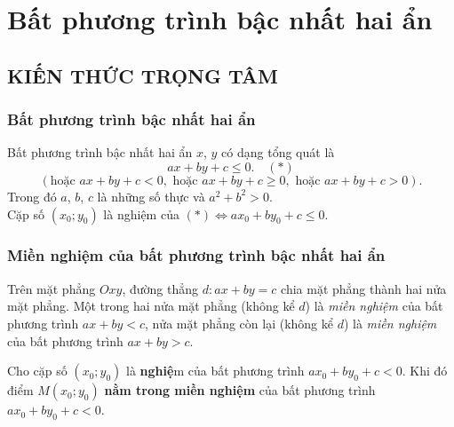 \def\tenchude{BẤT PHƯƠNG TRÌNH BẬC NHẤT HAI ẨN}

\setcounter{section}{2}
\section{Bất phương trình bậc nhất hai ẩn}
\subsection{KIẾN THỨC TRỌNG TÂM}
\subsubsection{Bất phương trình bậc nhất hai ẩn}
\begin{khung4}{}
Bất phương trình bậc nhất hai ẩn $x$, $y$ có dạng tổng quát là
$$
ax+by+c\leq 0.\quad (*)$$
$$(\text{hoặc }ax+by+c<0, \text{ hoặc } ax+by+c\geq 0, \text{ hoặc }ax+by+c>0).
$$
Trong đó $a$, $b$, $c$ là những số thực và $a^2+b^2 > 0$.\\
Cặp số $\left(x_0;y_0\right)$ là nghiệm của $(*)\Leftrightarrow ax_0+by_0+c\leq 0$.
\end{khung4}
\subsubsection{Miền nghiệm của bất phương trình bậc nhất hai ẩn}

\begin{khung4}{}
	Trên mặt phẳng $Oxy$, đường thẳng $d\colon ax+by=c$ chia mặt phẳng thành hai nửa mặt phẳng. Một trong hai nửa mặt phẳng (không kể $d$) là \textit{miền nghiệm} của bất phương trình $ax+by<c$, nửa mặt phẳng còn lại (không kể $d$) là \textit{miền nghiệm} của bất phương trình $ax+by>c$.
\end{khung4}
\begin{khung4}{}
	Cho cặp số $\left(x_0;y_0\right)$ là \textbf{nghiệ}m của bất phương trình $ax_0+by_0+c < 0$. Khi đó điểm $M(x_0;y_0)$ \textbf{nằm trong miền nghiệm} của bất phương trình $ax_0+by_0+c < 0$.
\end{khung4}
